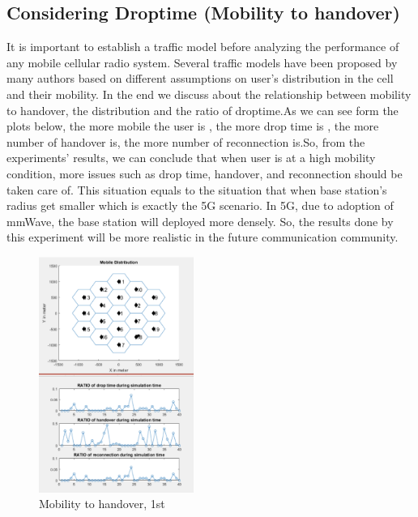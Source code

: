 \documentclass[a4paper]{IEEEtran}
\begin{document}
\subsection{Considering Droptime (Mobility to handover)}
It is important to establish a traffic model before analyzing the performance of any mobile cellular radio system. Several traffic models have been proposed by many authors based on different assumptions on user’s distribution in the cell and their mobility. In the end we discuss about the relationship between mobility to handover, the distribution and the ratio of droptime.As we can see form the plots below, the more mobile the user is , the more drop time is , the more number of handover is,  the more number of reconnection is.So, from the experiments’ results, we can conclude that when user is at a high mobility condition, more issues such as drop time, handover, and reconnection should be taken care of. This situation equals to the situation that when base station’s radius get smaller which is exactly the 5G scenario. In 5G, due to adoption of mmWave, the base station will deployed more densely. So, the results done by this experiment will be more realistic in the future communication community.

\begin{figure}[h]
    \includegraphics[width=0.45\textwidth]{exp2/1}
    \caption{Mobility to handover, 1st}
    \label{fig:mesh16}
\end{figure}

\pagebreak
\end{document}
